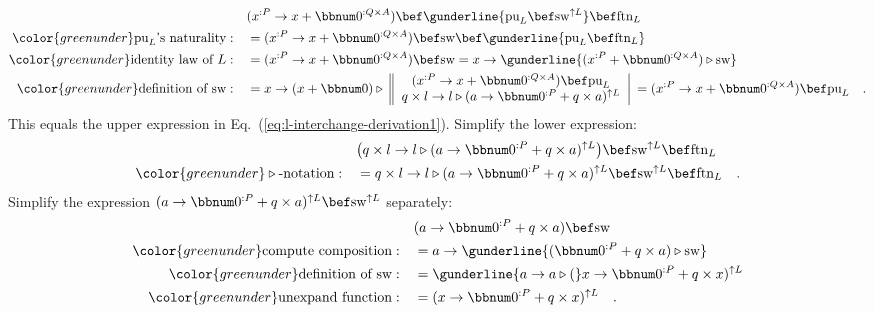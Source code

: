 \begin{align*}
 & (x^{:P}\rightarrow x+\bbnum 0^{:Q\times A})\bef\gunderline{\text{pu}_{L}\bef\text{sw}^{\uparrow L}}\bef\text{ftn}_{L}\\
{\color{greenunder}\text{pu}_{L}\text{\textsf{'}s naturality}:}\quad & =(x^{:P}\rightarrow x+\bbnum 0^{:Q\times A})\bef\text{sw}\bef\gunderline{\text{pu}_{L}\bef\text{ftn}_{L}}\\
{\color{greenunder}\text{identity law of }L:}\quad & =(x^{:P}\rightarrow x+\bbnum 0^{:Q\times A})\bef\text{sw}=x\rightarrow\gunderline{(x^{:P}+\bbnum 0^{:Q\times A})\triangleright\text{sw}}\\
{\color{greenunder}\text{definition of }\text{sw}:}\quad & =x\rightarrow(x+\bbnum 0)\triangleright\,\left\Vert \begin{array}{c}
(x^{:P}\rightarrow x+\bbnum 0^{:Q\times A})\bef\text{pu}_{L}\\
q\times l\rightarrow l\triangleright(a\rightarrow\bbnum 0^{:P}+q\times a)^{\uparrow L}
\end{array}\right|\,=(x^{:P}\rightarrow x+\bbnum 0^{:Q\times A})\bef\text{pu}_{L}\quad.
\end{align*}
This equals the upper expression in Eq.~(\ref{eq:l-interchange-derivation1}).
Simplify the lower expression:
\begin{align}
 & \big(q\times l\rightarrow l\triangleright(a\rightarrow\bbnum 0^{:P}+q\times a)^{\uparrow L}\big)\bef\text{sw}^{\uparrow L}\bef\text{ftn}_{L}\nonumber \\
{\color{greenunder}\triangleright\text{-notation}:}\quad & =q\times l\rightarrow l\triangleright(a\rightarrow\bbnum 0^{:P}+q\times a)^{\uparrow L}\bef\text{sw}^{\uparrow L}\bef\text{ftn}_{L}\quad.\label{eq:l-interchange-simplify-2}
\end{align}
Simplify the expression $(a\rightarrow\bbnum 0^{:P}+q\times a)^{\uparrow L}\bef\text{sw}^{\uparrow L}$
separately:
\begin{align}
 & (a\rightarrow\bbnum 0^{:P}+q\times a)\bef\text{sw}\nonumber \\
{\color{greenunder}\text{compute composition}:}\quad & =a\rightarrow\gunderline{(\bbnum 0^{:P}+q\times a)\triangleright\text{sw}}\nonumber \\
{\color{greenunder}\text{definition of }\text{sw}:}\quad & =\gunderline{a\rightarrow a\triangleright(}x\rightarrow\bbnum 0^{:P}+q\times x)^{\uparrow L}\nonumber \\
{\color{greenunder}\text{unexpand function}:}\quad & =(x\rightarrow\bbnum 0^{:P}+q\times x)^{\uparrow L}\quad.\label{eq:l-interchange-simplify-3}
\end{align}
